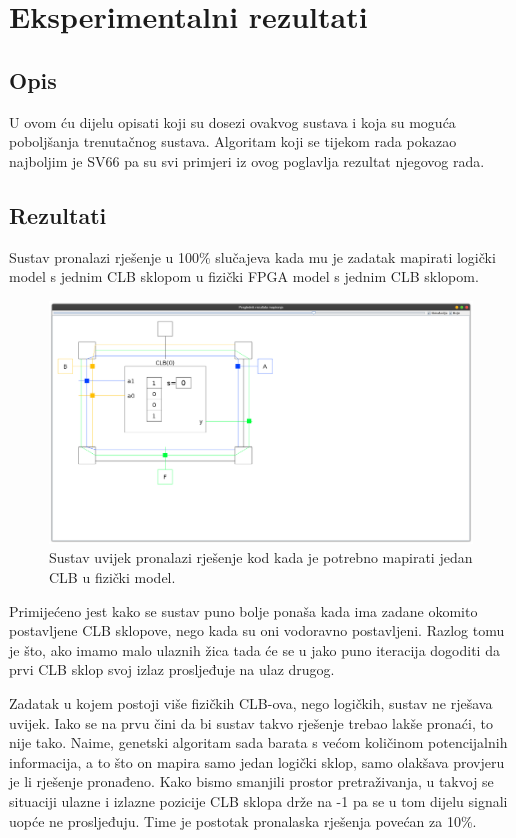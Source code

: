 \documentclass[times, utf8, zavrsni]{fer}
\begin{document}
	
	\chapter{Eksperimentalni rezultati}
	
	\section{Opis}
	
	U ovom ću dijelu opisati koji su dosezi ovakvog sustava i koja su moguća poboljšanja trenutačnog sustava. Algoritam koji se tijekom rada pokazao najboljim je SV66 pa su svi primjeri iz ovog poglavlja rezultat njegovog rada. 
	
	\section{Rezultati}
	
	Sustav pronalazi rješenje u 100\% slučajeva kada mu je zadatak mapirati logički model s jednim CLB sklopom u fizički FPGA model s jednim CLB sklopom.
	
	
	\begin{figure}[H]
		\centering
		\includegraphics[width=15cm]{slike/1111.png}
		\caption{Sustav uvijek pronalazi rješenje kod kada je potrebno mapirati jedan CLB u fizički model.}
		\label{fig:1111-founded-img}
	\end{figure} 
		
		Primijećeno jest kako se sustav puno bolje ponaša kada ima zadane okomito postavljene CLB sklopove, nego kada su oni vodoravno postavljeni. Razlog tomu je što, ako imamo malo ulaznih žica tada će se u jako puno iteracija dogoditi da prvi CLB sklop svoj izlaz prosljeđuje na ulaz drugog. 
		
		
		Zadatak u kojem postoji više fizičkih CLB-ova, nego logičkih, sustav ne rješava uvijek. Iako se na prvu čini da bi sustav takvo rješenje trebao lakše pronaći, to nije tako. Naime, genetski algoritam sada barata s većom količinom potencijalnih informacija, a to što on mapira samo jedan logički sklop, samo olakšava provjeru je li rješenje pronađeno.
		Kako bismo smanjili prostor pretraživanja, u takvoj se situaciji ulazne i izlazne pozicije CLB sklopa drže na -1 pa se u tom dijelu signali uopće ne prosljeđuju. Time je postotak pronalaska rješenja povećan za 10\%.
		
\end{document}
